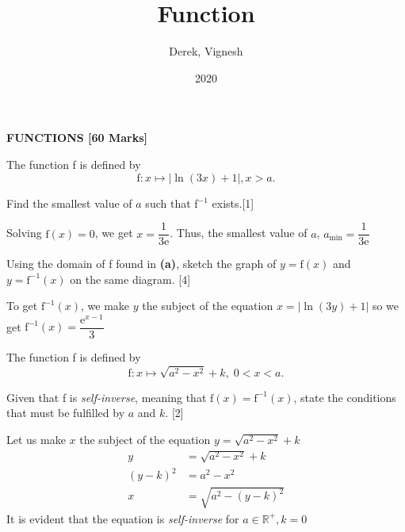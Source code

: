 \documentclass[12pt, a4 paper]{article}
\title{Function}
\author{Derek, Vignesh}
\date{2020}
\begin{document}
\maketitle

\textbf{FUNCTIONS [60 Marks]}
\begin{outline}[enumerate]
	\1 The function f is defined by \[\textrm{f}:x \mapsto \left|\ln{(3x)+1}\right|, x>a.\] %
		        
	\2 Find the smallest value of $a$ such that \textrm{f}$^{-1}$ exists.\hfill[1]
	\begin{answer}
		Solving $\textrm{f}(x)=0$, we get $x=\dfrac{1}{3\mathrm{e}}$. Thus, the smallest value of $a$, $a_\textrm{min}=\dfrac{1}{3\mathrm{e}}$
	\end{answer}
		        
	\2 Using the domain of f found in \textbf{(a)}, sketch the graph of $y=\textrm{f}(x)$ and $y=\textrm{f}^{-1}(x)$ on the same diagram. \hfill[4]
	\begin{answer}
		To get $\textrm{f}^{-1}(x)$, we make $y$ the subject of the equation $x=|\ln{(3y)+1}|$ so we get $\textrm{f}^{-1}(x)=\dfrac{\mathrm{e}^{x-1}}{3}$ \\
		\vspace{3mm}
		\color{black}
	\end{answer}
		        
		        
	\1 The function f is defined by \[\textrm{f}:x \mapsto \sqrt{a^2-x^2}+k,\;0< x <a.\] %
		    
	\2 Given that f is \emph{self-inverse}, meaning that $\textrm{f}(x)=\textrm{f}^{-1}(x)$, state the conditions that must be fulfilled by $a$ and $k$. \hfill[2]
	\begin{answer}
		Let us make $x$ the subject of the equation $y=\sqrt{a^2-x^2}+k$
		\begin{align*}
			y       & =\sqrt{a^2-x^2}+k    \\
			(y-k)^2 & = a^2-x^2            \\
			x       & = \sqrt{a^2-(y-k)^2} 
		\end{align*}
		It is evident that the equation is \emph{self-inverse} for $a\in\mathbb{R}^+, k=0$
	\end{answer}
		        

\end{outline}
\end{document}

